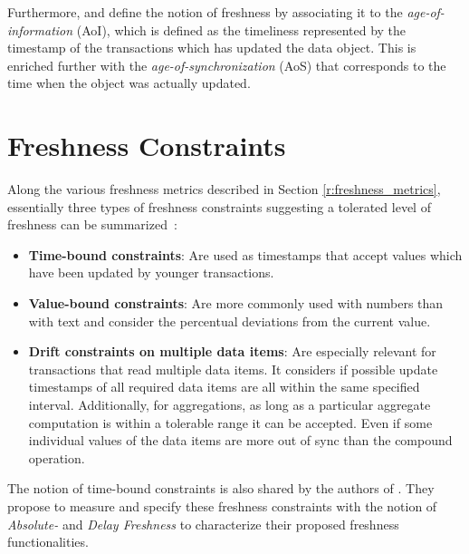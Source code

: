 Furthermore, \cite{bedewy:2016} and \cite{zhong:2018} define the notion of freshness by associating it to the \emph{age-of-information} (AoI),
which is defined as the timeliness represented by the timestamp of the transactions which has updated the data object. 
This is enriched further with the \emph{age-of-synchronization} (AoS) that corresponds to the time when the object was actually updated.




\section{Freshness Constraints}
\label{r:express_freshness}

Along the various freshness metrics described in Section \ref{r:freshness_metrics}, essentially three types of freshness constraints
suggesting a tolerated level of freshness can be summarized~\cite{tamer:2005, hennemann_sw_2021}:
\begin{itemize}
    \item \textbf{Time-bound constraints}: Are used as timestamps that accept values which have been updated by younger transactions. 

    \item \textbf{Value-bound constraints}: Are more commonly used with numbers than with text and consider the percentual deviations from the current value.

    \item \textbf{Drift constraints on multiple data items}: Are especially relevant for transactions that read multiple data items. It considers if possible 
    update timestamps of all required data items are all within the same specified interval. Additionally, for aggregations, as long as a particular aggregate computation 
    is within a tolerable range it can be accepted. Even if some individual values of the data items are more out of sync than the compound operation.
\end{itemize}

The notion of time-bound constraints is also shared by the authors of \cite{voicu:2010}. They propose to measure and specify these freshness constraints 
with the notion of \emph{Absolute-} and \emph{Delay Freshness} to characterize their proposed freshness functionalities.

